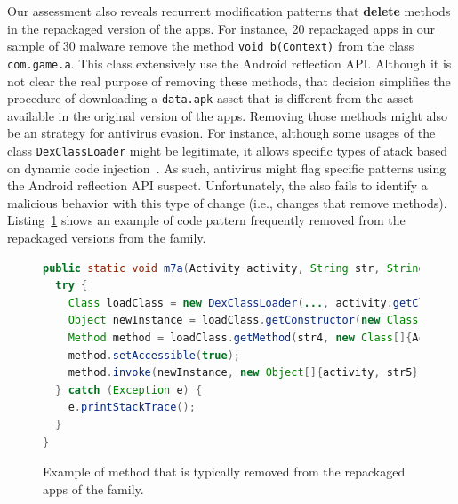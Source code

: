 Our assessment also reveals recurrent modification patterns that {\bf delete} methods in the
repackaged version of the apps. For instance, 20 repackaged apps in our
\gps sample of 30 malware remove the method \texttt{void b(Context)} from the
class \texttt{com.game.a}. This class extensively use 
the Android reflection API. Although it is not clear the real purpose of removing these methods,
that decision simplifies the procedure of downloading a \texttt{data.apk} asset that is different
from the asset available in the original version of the apps. Removing those methods might
also be an strategy for antivirus evasion. For instance, although
some usages of the class \texttt{DexClassLoader} might be legitimate, it allows specific
types of atack based on dynamic code injection~\cite{falsina:acsac}. As such, 
antivirus might flag specific patterns using the Android reflection API suspect. 
Unfortunately, the \mas also fails to identify
a malicious behavior with this type of change (i.e., changes that remove methods).
Listing~\ref{code:deletedMethod} shows an example of code pattern frequently removed
from the repackaged versions from the \gps family. 

\begin{figure}[t]
\begin{lstlisting}[language=Java]
public static void m7a(Activity activity, String str, String str2, ... , String str5) {
  try {
    Class loadClass = new DexClassLoader(..., activity.getClassLoader()).loadClass(str3);
    Object newInstance = loadClass.getConstructor(new Class[0]).newInstance(new Object[0]);
    Method method = loadClass.getMethod(str4, new Class[]{Activity.class, String.class});
    method.setAccessible(true);
    method.invoke(newInstance, new Object[]{activity, str5});
  } catch (Exception e) {
    e.printStackTrace();
  }
}  
\end{lstlisting}
\caption{Example of method that is typically removed from the repackaged apps of the \gps family.}
\label{code:deletedMethod}
\end{figure}

